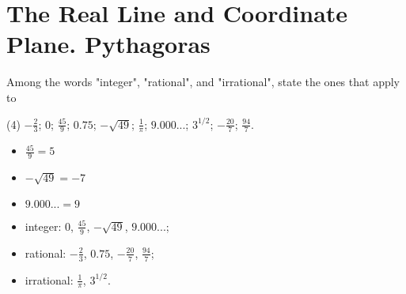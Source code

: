 \section{The Real Line and Coordinate Plane. Pythagoras}

\begin{questions}
    \item Among the words "integer", "rational", and "irrational", state the ones that apply to
        \begin{tasks}(4)
            \task \( -\frac{2}{3}\);
            \task \(0\);
            \task \(\frac{45}{9}\);
            \task \(0.75\);
            \task \(-\sqrt{49}\);
            \task \(\frac{1}{\pi}\);
            \task \(9.000...\);
            \task \(3^{1/2}\);
            \task \(-\frac{20}{7}\);
            \task \(\frac{94}{7}\).
        \end{tasks}
        \begin{note}
            \begin{itemize}
                \item \(\frac{45}{9} = 5\)
                \item \(-\sqrt{49} = -7\)
                \item \(9.000... = 9\)
            \end{itemize}
        \end{note}
        \begin{solution}
            \begin{itemize}
                \item integer: \(0\), \(\frac{45}{9}\), \(-\sqrt{49}\), \(9.000...\);
                \item rational: \(-\frac{2}{3}\), \(0.75\), \(-\frac{20}{7}\), \(\frac{94}{7}\);
                \item irrational: \(\frac{1}{\pi}\), \(3^{1/2}\).
            \end{itemize}
        \end{solution}
\end{questions}